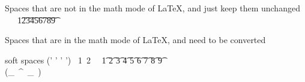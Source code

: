 Spaces that are not in the math mode of LaTeX, and just keep them unchanged
~ ~
\,\;\ \t1\t2\t3\t4\t5\t6\t7\t8\t9
\\\also\znewpage


Spaces that are in the math mode of LaTeX, and need to be converted 
\begin{zed}
soft spaces (' ' '	')
\testcmd~1~2
\,
\;
\ 
\t1
\t2
\t3
\t4
\t5
\t6
\t7
\t8
\t9
\\
\also
\znewpage
\function (\_~^{~\_~})
\end{zed}
